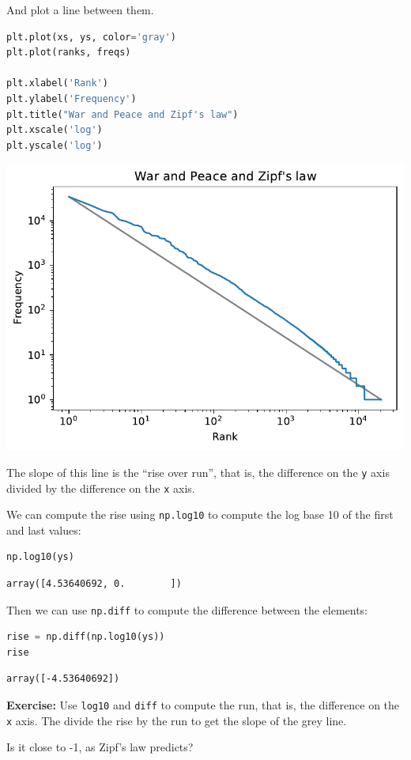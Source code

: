 And plot a line between them.

\begin{lstlisting}[language=Python]
plt.plot(xs, ys, color='gray')
plt.plot(ranks, freqs)

plt.xlabel('Rank')
plt.ylabel('Frequency')
plt.title("War and Peace and Zipf's law")
plt.xscale('log')
plt.yscale('log')
\end{lstlisting}

\begin{center}
\includegraphics[scale=0.75]{chapters/06_plotting_files/06_plotting_85_0.pdf}
\end{center}

The slope of this line is the ``rise over run'', that is, the difference
on the \passthrough{\lstinline!y!} axis divided by the difference on the
\passthrough{\lstinline!x!} axis.

We can compute the rise using \passthrough{\lstinline!np.log10!} to
compute the log base 10 of the first and last values:

\begin{lstlisting}[language=Python]
np.log10(ys)
\end{lstlisting}

\begin{lstlisting}[]
array([4.53640692, 0.        ])
\end{lstlisting}

Then we can use \passthrough{\lstinline!np.diff!} to compute the
difference between the elements:

\begin{lstlisting}[language=Python]
rise = np.diff(np.log10(ys))
rise
\end{lstlisting}

\begin{lstlisting}[]
array([-4.53640692])
\end{lstlisting}

\textbf{Exercise:} Use \passthrough{\lstinline!log10!} and
\passthrough{\lstinline!diff!} to compute the run, that is, the
difference on the \passthrough{\lstinline!x!} axis. The divide the rise
by the run to get the slope of the grey line.

Is it close to -1, as Zipf's law predicts?


